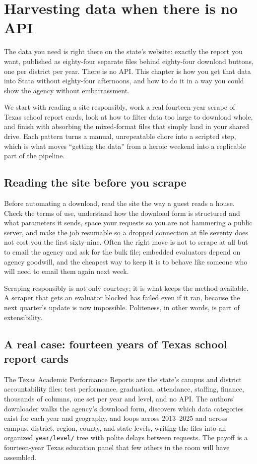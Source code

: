 \documentclass[
    a4paper,
    fontsize=10pt,
    twoside=true,
    numbers=noenddot,
]{kaobook}
\begin{document}
\chapter{Harvesting data when there is no API}\label{ch:noapi}

The data you need is right there on the state's website: exactly the report you want, published as eighty-four separate files behind eighty-four download buttons, one per district per year. There is no API. This chapter is how you get that data into Stata without eighty-four afternoons, and how to do it in a way you could show the agency without embarrassment.

We start with reading a site responsibly, work a real fourteen-year scrape of Texas school report cards, look at how to filter data too large to download whole, and finish with absorbing the mixed-format files that simply land in your shared drive. Each pattern turns a manual, unrepeatable chore into a scripted step, which is what moves \enquote{getting the data} from a heroic weekend into a replicable part of the pipeline.

\section{Reading the site before you scrape}
Before automating a download, read the site the way a guest reads a house. Check the terms of use, understand how the download form is structured and what parameters it sends, space your requests so you are not hammering a public server, and make the job resumable so a dropped connection at file seventy does not cost you the first sixty-nine. Often the right move is not to scrape at all but to email the agency and ask for the bulk file; embedded evaluators depend on agency goodwill, and the cheapest way to keep it is to behave like someone who will need to email them again next week.

Scraping responsibly is not only courtesy; it is what keeps the method available. A scraper that gets an evaluator blocked has failed even if it ran, because the next quarter's update is now impossible. Politeness, in other words, is part of extensibility.

\section{A real case: fourteen years of Texas school report cards}
The Texas Academic Performance Reports are the state's campus and district accountability files: test performance, graduation, attendance, staffing, finance, thousands of columns, one set per year and level, and no API. The authors' downloader walks the agency's download form, discovers which data categories exist for each year and geography, and loops across 2013--2025 and across campus, district, region, county, and state levels, writing the files into an organized \texttt{year/level/} tree with polite delays between requests. The payoff is a fourteen-year Texas education panel that few others in the room will have assembled.
\end{document}
